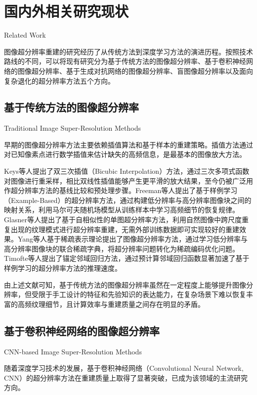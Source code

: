\section{国内外相关研究现状}{Related Work}

图像超分辨率重建的研究经历了从传统方法到深度学习方法的演进历程。按照技术路线的不同，可以将现有研究分为基于传统方法的图像超分辨率、基于卷积神经网络的图像超分辨率、基于生成对抗网络的图像超分辨率、盲图像超分辨率以及面向复杂退化的超分辨率方法五个方向。

\subsection{基于传统方法的图像超分辨率}{Traditional Image Super-Resolution Methods}

早期的图像超分辨率方法主要依赖插值算法和基于样本的重建策略。插值方法通过对已知像素点进行数学插值来估计缺失的高频信息，是最基本的图像放大方法。

Keys等人提出了双三次插值（Bicubic Interpolation）方法\cite{keys1981cubic}，通过三次多项式函数对图像进行重采样，相比双线性插值能够产生更平滑的放大结果，至今仍被广泛用作超分辨率方法的基线比较和预处理步骤。Freeman等人提出了基于样例学习（Example-Based）的超分辨率方法\cite{freeman2002example}，通过构建低分辨率与高分辨率图像块之间的映射关系，利用马尔可夫随机场模型从训练样本中学习高频细节的恢复规律。Glasner等人提出了基于自相似性的单图超分辨率方法\cite{glasner2009super}，利用自然图像中跨尺度重复出现的纹理模式进行超分辨率重建，无需外部训练数据即可实现较好的重建效果。Yang等人基于稀疏表示理论提出了图像超分辨率方法\cite{yang2010image}，通过学习低分辨率与高分辨率图像块的联合稀疏字典，将超分辨率问题转化为稀疏编码优化问题。Timofte等人提出了锚定邻域回归方法\cite{timofte2013anchored}，通过预计算邻域回归函数显著加速了基于样例学习的超分辨率方法的推理速度。

由上述文献可知，基于传统方法的图像超分辨率虽然在一定程度上能够提升图像分辨率，但受限于手工设计的特征和先验知识的表达能力，在复杂场景下难以恢复丰富的高频纹理细节，且计算效率与重建质量之间存在明显的矛盾。

\subsection{基于卷积神经网络的图像超分辨率}{CNN-based Image Super-Resolution Methods}

随着深度学习技术的发展，基于卷积神经网络（Convolutional Neural Network, CNN）的超分辨率方法在重建质量上取得了显著突破，已成为该领域的主流研究方向。

